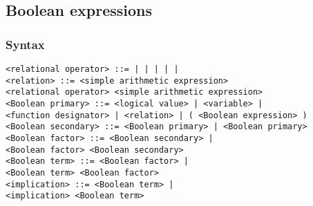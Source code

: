 \documentclass[a4paper,11pt]{article}
\begin{document}
\subsection{Boolean expressions}
\label{LblBooleanExpressions}


\subsubsection{Syntax}
\label{LblBooleanExpressionsSyntax}

\begin{flushleft}

\vspace{0.2em}\texttt{<relational operator> ::= \mlt{} | \mle{} | \meq{} | \mge{} | \mgt{} | \mne{}}\\

\vspace{0.2em}\texttt{<relation> ::= <simple arithmetic expression> \\
  \hspace{1.0cm}<relational operator> <simple arithmetic expression>}\\

\vspace{0.2em}\texttt{<Boolean primary> ::= <logical value> | <variable> |\\
  \hspace{1.0cm}<function designator> | <relation> | ( <Boolean expression> )}\\

\vspace{0.2em}\texttt{<Boolean secondary> ::= <Boolean primary> | \mlnot{} <Boolean primary>}\\

\vspace{0.2em}\texttt{<Boolean factor> ::= <Boolean secondary> |\\
  \hspace{1.0cm}<Boolean factor> \mland{} <Boolean secondary>}\\

\vspace{0.2em}\texttt{<Boolean term> ::= <Boolean factor> |\\
  \hspace{1.0cm}<Boolean term> \mlor{} <Boolean factor>}\\

\vspace{0.2em}\texttt{<implication> ::= <Boolean term> |\\
  \hspace{1.0cm}<implication> \mlimp{} <Boolean term>}\\


\end{flushleft}
\end{document}
